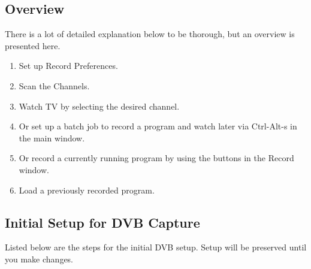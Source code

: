 \subsection{Overview}%
\label{sub:overview}

There is a lot of detailed explanation below to be thorough, but an overview is presented here.

\begin{enumerate}
    \item Set up Record Preferences.
    \item Scan the Channels.
    \item Watch TV by selecting the desired channel.
    \item Or set up a batch job to record a program and watch later via Ctrl-Alt-s in the main window.
    \item Or record a currently running program by using the buttons in the Record window.
    \item Load a previously recorded program.
\end{enumerate}

\subsection{Initial Setup for DVB Capture}%
\label{sub:initial_setup_dvb_capture}

Listed below are the steps for the initial DVB setup.  Setup will be preserved until you make changes.

